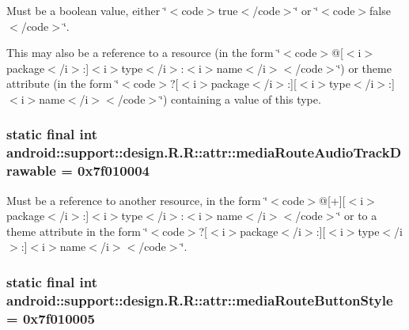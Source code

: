 Must be a boolean value, either \char`\"{}$<$code$>$true$<$/code$>$\char`\"{} or \char`\"{}$<$code$>$false$<$/code$>$\char`\"{}. 

This may also be a reference to a resource (in the form \char`\"{}$<$code$>$@\mbox{[}$<$i$>$package$<$/i$>$:\mbox{]}$<$i$>$type$<$/i$>$:$<$i$>$name$<$/i$>$$<$/code$>$\char`\"{}) or theme attribute (in the form \char`\"{}$<$code$>$?\mbox{[}$<$i$>$package$<$/i$>$:\mbox{]}\mbox{[}$<$i$>$type$<$/i$>$:\mbox{]}$<$i$>$name$<$/i$>$$<$/code$>$\char`\"{}) containing a value of this type. \hypertarget{classandroid_1_1support_1_1design_1_1_r_1_1attr_8a4606728f3f7d0fc6a690ae03b5ce8e}{
\subsubsection[{mediaRouteAudioTrackDrawable}]{\setlength{\rightskip}{0pt plus 5cm}static final int android::support::design.R.R::attr::mediaRouteAudioTrackDrawable = 0x7f010004}}
\label{classandroid_1_1support_1_1design_1_1_r_1_1attr_8a4606728f3f7d0fc6a690ae03b5ce8e}


Must be a reference to another resource, in the form \char`\"{}$<$code$>$@\mbox{[}+\mbox{]}\mbox{[}$<$i$>$package$<$/i$>$:\mbox{]}$<$i$>$type$<$/i$>$:$<$i$>$name$<$/i$>$$<$/code$>$\char`\"{} or to a theme attribute in the form \char`\"{}$<$code$>$?\mbox{[}$<$i$>$package$<$/i$>$:\mbox{]}\mbox{[}$<$i$>$type$<$/i$>$:\mbox{]}$<$i$>$name$<$/i$>$$<$/code$>$\char`\"{}. \hypertarget{classandroid_1_1support_1_1design_1_1_r_1_1attr_5be45e7e85bb1790524073d16fce47b1}{
\subsubsection[{mediaRouteButtonStyle}]{\setlength{\rightskip}{0pt plus 5cm}static final int android::support::design.R.R::attr::mediaRouteButtonStyle = 0x7f010005}}
\label{classandroid_1_1support_1_1design_1_1_r_1_1attr_5be45e7e85bb1790524073d16fce47b1}


